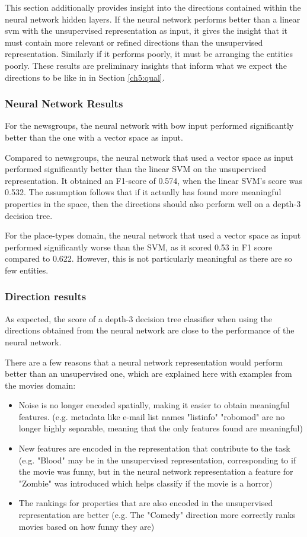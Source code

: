 This section additionally provides insight into the directions contained within the neural network hidden layers.  If the neural network performs better than a linear svm with the unsupervised representation as input, it gives the insight that it must contain more relevant or refined directions than the unsupervised representation. Similarly if it performs poorly, it must be arranging the entities poorly. These results are preliminary insights that inform what we expect the directions to be like in in Section \ref{ch5:qual}.

\subsubsection{Neural Network Results}

For the newsgroups, the neural network with bow input performed significantly better than the one with a vector space as input. 

Compared to newsgroups, the neural network that used a vector space as input performed significantly better than the linear SVM on the unsupervised representation. It obtained an F1-score of 0.574, when the linear SVM's score was 0.532. The assumption follows that if it actually has found more meaningful properties in the space, then the directions should also perform well on a depth-3 decision tree.

For the place-types domain, the neural network that used a vector space as input performed significantly worse than the SVM, as it scored 0.53 in F1 score compared to 0.622. However, this is not particularly meaningful as there are so few entities.

\subsubsection{Direction results}

As expected, the score of a depth-3  decision tree classifier when using the directions obtained from the neural network are close to the performance of the neural network. 

There are a few reasons that a neural network representation would perform better than an unsupervised one, which are explained here with examples from the movies domain:
\begin{itemize}
	\item Noise is no longer encoded spatially, making it easier to obtain meaningful features. (e.g. metadata like e-mail list names "listinfo" "robomod" are no longer highly separable, meaning that the only features found are meaningful)
	\item New features are encoded in the representation that contribute to the task (e.g. "Blood" may be in the unsupervised representation, corresponding to if the movie was funny, but in the neural network representation a feature for "Zombie" was introduced which helps classify if the movie is a horror)
	\item The rankings for properties that are also encoded in the unsupervised representation are better (e.g. The "Comedy" direction more correctly ranks movies based on how funny they are)
\end{itemize}

